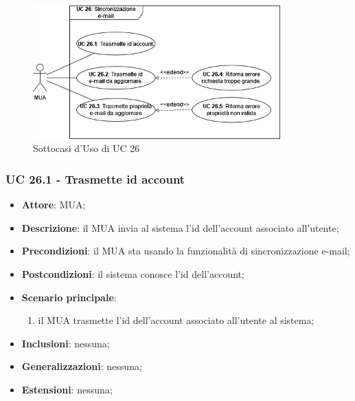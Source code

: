     \begin{figure}[H]
        \includegraphics[width=0.85\textwidth]{sections/uc_imgs/UC26.png}
        \centering
        \caption{Sottocasi d'Uso di UC 26}
    \end{figure}

    \subsubsection{UC 26.1 - Trasmette id account} \label{sec:UC26.1}
    \begin{itemize}
        \item \textbf{Attore}: MUA;
        \item \textbf{Descrizione}: il MUA invia al sistema l'id dell'account associato all'utente;
        \item \textbf{Precondizioni}: il MUA sta usando la funzionalità di sincronizzazione e-mail;
        \item \textbf{Postcondizioni}: il sistema conosce l'id dell'account;
        \item \textbf{Scenario principale}:
            \begin{enumerate}
                \item il MUA trasmette l'id dell'account associato all'utente al sistema;
            \end{enumerate}
        \item \textbf{Inclusioni}: nessuna;
        \item \textbf{Generalizzazioni}: nessuna;
        \item \textbf{Estensioni}: nessuna;
    \end{itemize}

